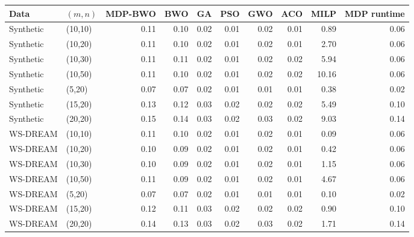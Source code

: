 \begin{tabular}{llrrrrrrrr}\toprule
Data & $(m,n)$ & MDP-BWO & BWO & GA & PSO & GWO & ACO & MILP & MDP runtime\\\midrule
Synthetic & (10,10) & 0.11 & 0.10 & 0.02 & 0.01 & 0.02 & 0.01 & 0.89 & 0.06\\
Synthetic & (10,20) & 0.11 & 0.10 & 0.02 & 0.01 & 0.02 & 0.01 & 2.70 & 0.06\\
Synthetic & (10,30) & 0.11 & 0.11 & 0.02 & 0.01 & 0.02 & 0.02 & 5.94 & 0.06\\
Synthetic & (10,50) & 0.11 & 0.10 & 0.02 & 0.01 & 0.02 & 0.02 & 10.16 & 0.06\\
Synthetic & (5,20) & 0.07 & 0.07 & 0.02 & 0.01 & 0.01 & 0.01 & 0.38 & 0.02\\
Synthetic & (15,20) & 0.13 & 0.12 & 0.03 & 0.02 & 0.02 & 0.02 & 5.49 & 0.10\\
Synthetic & (20,20) & 0.15 & 0.14 & 0.03 & 0.02 & 0.03 & 0.02 & 9.03 & 0.14\\
WS-DREAM & (10,10) & 0.11 & 0.10 & 0.02 & 0.01 & 0.02 & 0.01 & 0.09 & 0.06\\
WS-DREAM & (10,20) & 0.10 & 0.09 & 0.02 & 0.01 & 0.02 & 0.01 & 0.42 & 0.06\\
WS-DREAM & (10,30) & 0.10 & 0.09 & 0.02 & 0.01 & 0.02 & 0.01 & 1.15 & 0.06\\
WS-DREAM & (10,50) & 0.11 & 0.09 & 0.02 & 0.01 & 0.02 & 0.01 & 4.67 & 0.06\\
WS-DREAM & (5,20) & 0.07 & 0.07 & 0.02 & 0.01 & 0.01 & 0.01 & 0.10 & 0.02\\
WS-DREAM & (15,20) & 0.12 & 0.11 & 0.03 & 0.02 & 0.02 & 0.02 & 0.90 & 0.10\\
WS-DREAM & (20,20) & 0.14 & 0.13 & 0.03 & 0.02 & 0.03 & 0.02 & 1.71 & 0.14\\
\bottomrule
\end{tabular}
